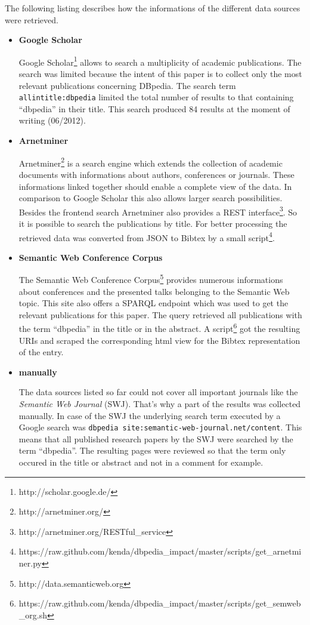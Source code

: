 \documentclass[english]{lni}
\begin{document}
   The following listing describes how the informations of the
   different data sources were retrieved.
\begin{itemize}
\item \textbf{Google Scholar}

     Google Scholar\footnote{http://scholar.google.de/ } allows to search a multiplicity of academic
     publications. The search was limited because the intent of this paper is to
     collect only the most relevant publications concerning DBpedia. The search
     term \texttt{allintitle:dbpedia} limited the total number of results to that
     containing ``dbpedia'' in their title. This search produced 84 results at the
     moment of writing (06/2012).
\item \textbf{Arnetminer}

     Arnetminer\footnote{http://arnetminer.org/ } is a search engine which extends the collection of
     academic documents with informations about authors, conferences or
     journals. These informations linked together should enable a complete view
     of the data. In comparison to Google Scholar this also allows larger search
     possibilities. Besides the frontend search Arnetminer also provides a REST
     interface\footnote{http://arnetminer.org/RESTful\_{}service }. So it is possible to search the publications by title. For
     better processing the retrieved data was converted from JSON to Bibtex by a
     small script\footnote{https://raw.github.com/kenda/dbpedia\_{}impact/master/scripts/get\_{}arnetminer.py }.
\item \textbf{Semantic Web Conference Corpus}

     The Semantic Web Conference Corpus\footnote{http://data.semanticweb.org } provides numerous informations about
     conferences and the presented talks belonging to the Semantic Web
     topic. This site also offers a SPARQL endpoint which was used to get the
     relevant publications for this paper. The query retrieved all publications
     with the term ``dbpedia'' in the title or in the abstract. A script\footnote{https://raw.github.com/kenda/dbpedia\_{}impact/master/scripts/get\_{}semweb\_{}org.sh } got
     the resulting URIs and scraped the corresponding html view for the Bibtex
     representation of the entry.
\item \textbf{manually}

     The data sources listed so far could not cover all important journals like
     the \emph{Semantic Web Journal} (SWJ). That's why a part of the results was
     collected manually. In case of the SWJ the underlying search term executed by a Google
     search was \texttt{dbpedia site:semantic-web-journal.net/content}. This means that all published research papers by the SWJ were
     searched by the term ``dbpedia''. The resulting pages were reviewed so that the
     term only occured in the title or abstract and not in a comment for example.
\end{itemize}
\end{document}

